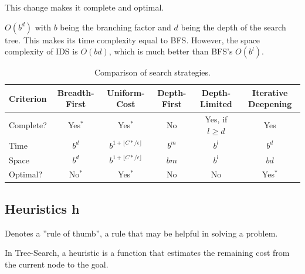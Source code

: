 \documentclass[
../EiKI_Summary.tex,
]
{subfiles}
\begin{document}
\begin{codebox}
    \begin{algorithm}[H]
    \end{algorithm}
\end{codebox}

This change makes it complete and optimal. 

 $O(b^d)$ with $b$ being the branching factor and $d$ being the depth of the search tree. This makes its time complexity equal to BFS. However, the space complexity of IDS is $O(bd)$, which is much better than BFS's $O(b^l)$.

\begin{table}[h!]
    \centering
    \begin{tabular}{@{}lccccc@{}}
    \toprule
    Criterion          & Breadth-First & Uniform-Cost & Depth-First & Depth-Limited & Iterative Deepening \\ \midrule
    Complete?          & Yes$^*$       & Yes$^*$      & No          & Yes, if $l \geq d$ & Yes                 \\
    Time               & $b^{d}$       & $b^{1 + \lfloor C* / \epsilon\rfloor}$ & $b^m$       & $b^l$          & $b^d$              \\
    Space              & $b^{d}$       & $b^{1 + \lfloor C* / \epsilon\rfloor}$ & $bm$        & $b^l$           & $bd$               \\
    Optimal?           & No$^*$       & Yes$^*$          & No          & No            & Yes$^*$          \\ \bottomrule
    \end{tabular}
    \caption{Comparison of search strategies.}
\end{table}

\newpage
\subsection{Heuristics h}
\begin{defbox*}
    Denotes a ''rule of thumb'', a rule that may be helpful in solving a problem.

    In Tree-Search, a heuristic is a function that estimates the remaining cost from the current node to the goal.

\end{defbox*}
\end{document}
